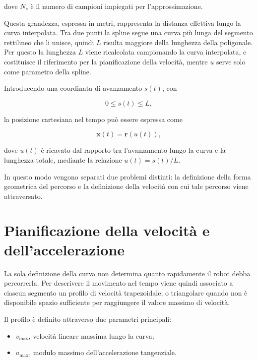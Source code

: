 dove $N_s$ è il numero di campioni impiegati per l'approssimazione.

Questa grandezza, espressa in metri, rappresenta la distanza effettiva lungo la curva interpolata.
Tra due punti la spline segue una curva più lunga del segmento rettilineo che li unisce, quindi $L$ risulta
maggiore della lunghezza della poligonale. Per questo la
lunghezza $L$ viene ricalcolata campionando la curva interpolata, e costituisce il riferimento per la pianificazione della velocità, mentre $u$ serve solo
come parametro della spline.

Introducendo una coordinata di avanzamento $s(t)$, con

\begin{equation}
    0 \leq s(t) \leq L,
\end{equation}

la posizione cartesiana nel tempo può essere espressa come

\begin{equation}
    \mathbf{x}(t)=\mathbf{r}\left(u(t)\right),
\end{equation}

dove $u(t)$ è ricavato dal rapporto tra l'avanzamento lungo la curva e la lunghezza totale, mediante la relazione $u(t)=s(t)/L$.

In questo modo vengono separati due problemi distinti: la definizione della forma geometrica del percorso e la definizione della velocità con cui tale percorso viene attraversato.

\section{Pianificazione della velocità e dell'accelerazione}

La sola definizione della curva non determina quanto rapidamente il robot debba percorrerla. Per descrivere il movimento nel tempo viene quindi associato a ciascun segmento un profilo di velocità trapezoidale, o triangolare quando non è disponibile spazio sufficiente per raggiungere il valore massimo di velocità.

Il profilo è definito attraverso due parametri principali:
\begin{itemize}
    \item $v_{\max}$, velocità lineare massima lungo la curva;
    \item $a_{\max}$, modulo massimo dell'accelerazione tangenziale.
\end{itemize}

